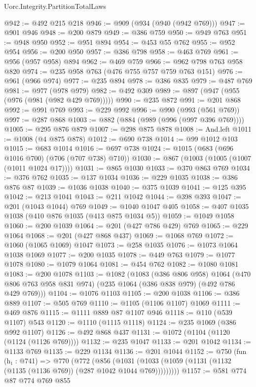 \begin{lexlean}{Uorc.Integrity.PartitionTotalLaws}
\begin{coremodule}
@942 := @492 @215 @218
@946 := @909 (@934 (@940 (@942 @769)))
@947 := @901 @946
@948 := @200 @879
@949 := @386 @759
@950 := @949 @763
@951 := @948 @950
@952 := @951 @894
@954 := @453 @55 @762
@955 := @952 @954
@956 := @200 @950
@957 := @386 @798
@958 := @463 @769
@961 := @956 (@957 @958) @894
@962 := @469 @759
@966 := @962 @798 @763 @958 @820
@974 := @235 @958 @763 (@476 @755 @757 @759 @763 @151)
@976 := @961 (@966 @974)
@977 := @235 @894
@978 := @386 @835
@979 := @487 @769
@981 := @977 (@978 @979)
@982 := @492 @309
@989 := @897 (@947 (@955 (@976 (@981 (@982 @429 @769)))))
@990 := @235 @872
@991 := @201 @868
@992 := @991 @769
@993 := @229 @992
@996 := @990 (@993 (@561 @769))
@997 := @287 @868
@1003 := @882 (@884 (@989 (@996 (@997 @396 @769))))
@1005 := @295 @876 @879
@1007 := @298 @875 @878
@1008 := And.left
@1011 := @1008 (@4 @875 @878)
@1012 := @690 @738
@1014 := @99 @1012 @103
@1015 := @683 @1014
@1016 := @697 @738
@1024 := @1015 (@683 (@696 @1016 @700) (@706 (@707 @738) @710))
@1030 := @867 (@1003 (@1005 (@1007 (@1011 @1024 @17))))
@1031 := @865 @1030
@1033 := @370 @863 @769
@1034 := @376 @762
@1035 := @137 @1034
@1036 := @229 @1035
@1038 := @386 @876 @87
@1039 := @1036 @1038
@1040 := @375 @1039
@1041 := @125 @395
@1042 := @213 @1041
@1043 := @211 @1042
@1044 := @398 @393
@1047 := @201 (@1043 @1044) @769
@1049 := @1040 @1047 @405
@1058 := @407 @1035 @1038 (@410 @876 @1035 (@413 @875 @1034 @5))
@1059 := @1049 @1058
@1060 := @200 @1039
@1064 := @201 (@427 @786 @429) @769
@1065 := @229 @1064
@1068 := @201 (@427 @868 @437)
@1069 := @1068 @769
@1072 := @1060 (@1065 @1069) @1047
@1073 := @258 @1035
@1076 := @1073 @1064 @1038 @1069
@1077 := @200 @1035
@1078 := @449 @763
@1079 := @1077 @1078
@1080 := @1079 @1064
@1081 := @454 @762
@1082 := @1080 @1081
@1083 := @200 @1078
@1103 := @1082
    (@1083
      (@386 @806 @958)
      @1064
      (@470 @806 @763 @958 @831 @974)
      (@235 @1064 (@386 @838 @979) (@492 @786 @429 @769)))
@1104 := @1076 @1103
@1105 := @200 @1038
@1106 := @386 @889
@1107 := @505 @769
@1110 := @1105 (@1106 @1107) @1069
@1111 := @469 @876
@1115 := @1111 @889 @87 @1107 @946
@1118 := @110 (@539 @1107) @543
@1120 := @1110 (@1115 @1118)
@1124 := @235 @1069 (@386 @992 @1107)
@1126 := @492 @868 @437
@1131 := @1072 (@1104 (@1120 (@1124 (@1126 @769))))
@1132 := @235 @1047
@1133 := @201 @1042
@1134 := @1133 @769
@1135 := @229 @1134
@1136 := @201 @1044
@1152 := @750
    (fun (h₁ : @741) =>
    @770
      (@772
        (@856
          (@1031 (@1033 (@1059 (@1131 (@1132 (@1135 (@1136 @769)) (@287 @1042 @1044 @769)))))))))
@1157 := @581 @774 @87 @774 @769 @855

\end{coremodule}
\end{lexlean}
